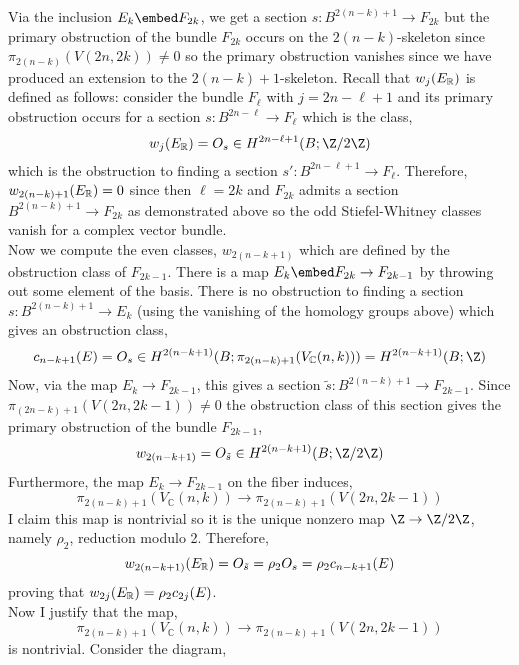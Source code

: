 \documentclass[12pt]{extarticle}
\newcommand{\C}{\mathbb{C}}
\begin{document}
Via the inclusion $E_k \embed F_{2k}$, we get a section $s : B^{2 (n - k) + 1} \to F_{2k}$ but the primary obstruction of the bundle $F_{2k}$ occurs on the $2(n - k)$-skeleton since $\pi_{2(n-k)}(V(2n, 2k)) \neq 0$ so the primary obstruction vanishes since we have produced an extension to the $2(n-k) + 1$-skeleton. Recall that $w_{j}(E_{\mathbb{R}})$ is defined as follows: consider the bundle $F_{\ell}$ with $j = 2n - \ell + 1$ and its primary obstruction occurs for a section $s : B^{2n-\ell} \to F_{\ell}$ which is the class,
\[ w_{j}(E_\R) = O_{s} \in H^{2n - \ell + 1}(B; \Z / 2 \Z) \]
which is the obstruction to finding a section $s' : B^{2n - \ell + 1} \to F_{\ell}$. Therefore, $w_{2(n - k) + 1}(E_{\mathbb{R}}) = 0$ since then $\ell = 2 k$ and $F_{2k}$ admits a section $B^{2(n - k) + 1} \to F_{2k}$ as demonstrated above so the odd Stiefel-Whitney classes vanish for a complex vector bundle.
\bigskip\\
Now we compute the even classes, $w_{2(n-k + 1)}$ which are defined by the obstruction class of $F_{2k - 1}$. There is a map $E_{k} \embed F_{2k} \to F_{2k - 1}$ by throwing out some element of the basis. There is no obstruction to finding a section $s : B^{2(n - k) + 1} \to E_k$ (using the vanishing of the homology groups above) which gives an obstruction class,
\[ c_{n-k+1}(E) = O_s \in H^{2(n - k + 1)}(B; \pi_{2(n-k) + 1}(V_\C(n, k))) = H^{2(n - k + 1)}(B; \Z) \]
Now, via the map $E_{k} \to F_{2k - 1}$, this gives a section $\tilde{s} : B^{2(n - k) + 1} \to F_{2k - 1}$. Since $\pi_{(2 n - k) + 1}(V(2n, 2k - 1)) \neq 0$ the obstruction class of this section gives the primary obstruction of the bundle $F_{2k - 1}$,
\[ w_{2(n - k + 1)} = O_{\tilde{s}} \in H^{2(n - k + 1)}(B; \Z / 2 \Z) \]
Furthermore, the map $E_k \to F_{2k - 1}$ on the fiber induces,
\[ \pi_{2(n - k) + 1}(V_\C(n, k)) \to \pi_{2(n - k) + 1}(V(2n, 2k - 1)) \]
I claim this map is nontrivial so it is the unique nonzero map $\Z \to \Z / 2 \Z$, namely $\rho_2$, reduction modulo 2. Therefore, 
\[ w_{2(n - k + 1)}(E_{\mathbb{R}}) = O_{\tilde{s}} = \rho_2 O_{s} = \rho_2 c_{n - k + 1}(E) \]
proving that $w_{2j}(E_{\mathbb{R}}) = \rho_2 c_{2j}(E)$. 
\bigskip\\
Now I justify that the map,
\[ \pi_{2(n - k) + 1}(V_\C(n, k)) \to \pi_{2(n - k) + 1}(V(2n, 2k - 1)) \]
is nontrivial. Consider the diagram,
\begin{center}
\end{center}
\end{document}
